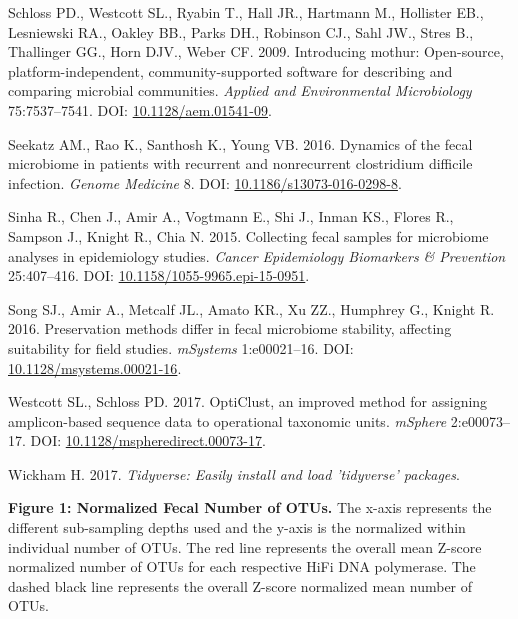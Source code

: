 \documentclass[12pt,]{article}
\begin{document}
\hypertarget{ref-mothur_schloss_2009}{}
Schloss PD., Westcott SL., Ryabin T., Hall JR., Hartmann M., Hollister
EB., Lesniewski RA., Oakley BB., Parks DH., Robinson CJ., Sahl JW.,
Stres B., Thallinger GG., Horn DJV., Weber CF. 2009. Introducing mothur:
Open-source, platform-independent, community-supported software for
describing and comparing microbial communities. \emph{Applied and
Environmental Microbiology} 75:7537--7541. DOI:
\href{https://doi.org/10.1128/aem.01541-09}{10.1128/aem.01541-09}.

\hypertarget{ref-erin_seekatz_2016}{}
Seekatz AM., Rao K., Santhosh K., Young VB. 2016. Dynamics of the fecal
microbiome in patients with recurrent and nonrecurrent clostridium
difficile infection. \emph{Genome Medicine} 8. DOI:
\href{https://doi.org/10.1186/s13073-016-0298-8}{10.1186/s13073-016-0298-8}.

\hypertarget{ref-preservation_Sinha_2015}{}
Sinha R., Chen J., Amir A., Vogtmann E., Shi J., Inman KS., Flores R.,
Sampson J., Knight R., Chia N. 2015. Collecting fecal samples for
microbiome analyses in epidemiology studies. \emph{Cancer Epidemiology
Biomarkers \& Prevention} 25:407--416. DOI:
\href{https://doi.org/10.1158/1055-9965.epi-15-0951}{10.1158/1055-9965.epi-15-0951}.

\hypertarget{ref-preservation_Song_2016}{}
Song SJ., Amir A., Metcalf JL., Amato KR., Xu ZZ., Humphrey G., Knight
R. 2016. Preservation methods differ in fecal microbiome stability,
affecting suitability for field studies. \emph{mSystems} 1:e00021--16.
DOI:
\href{https://doi.org/10.1128/msystems.00021-16}{10.1128/msystems.00021-16}.

\hypertarget{ref-opticlust_Westcott_2017}{}
Westcott SL., Schloss PD. 2017. OptiClust, an improved method for
assigning amplicon-based sequence data to operational taxonomic units.
\emph{mSphere} 2:e00073--17. DOI:
\href{https://doi.org/10.1128/mspheredirect.00073-17}{10.1128/mspheredirect.00073-17}.

\hypertarget{ref-tidyverse_2017}{}
Wickham H. 2017. \emph{Tidyverse: Easily install and load 'tidyverse'
packages}.

\newpage

\textbf{Figure 1: Normalized Fecal Number of OTUs.} The x-axis
represents the different sub-sampling depths used and the y-axis is the
normalized within individual number of OTUs. The red line represents the
overall mean Z-score normalized number of OTUs for each respective HiFi
DNA polymerase. The dashed black line represents the overall Z-score
normalized mean number of OTUs.
\end{document}
